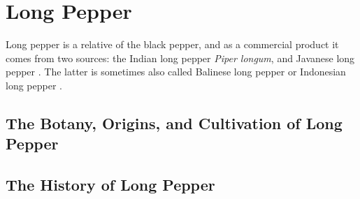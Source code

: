 \section{Long Pepper}
\label{sec:long_pepper}

Long pepper is a relative of the black pepper, and as a commercial product it comes from two sources: the Indian long pepper \textit{Piper longum}, and Javanese long pepper . The latter is sometimes also called Balinese long pepper or Indonesian long pepper .


\subsection{The Botany, Origins, and Cultivation of Long Pepper}

\subsection{The History of Long Pepper}

